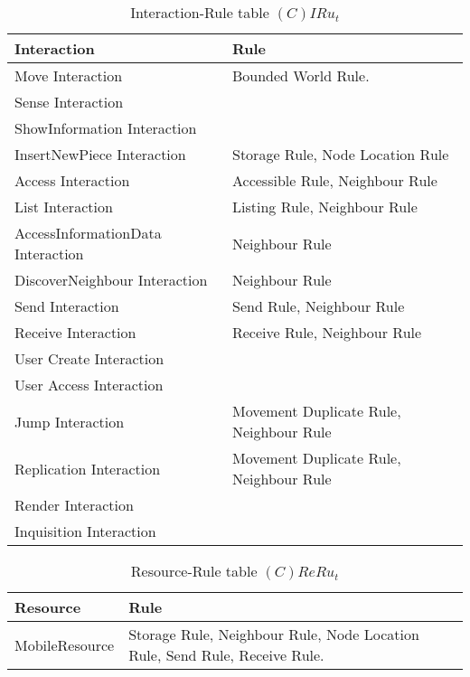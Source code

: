 \begin{table}[H]
	\centering
	\begin{tabular}{|p{4cm}|p{8cm}|}
			\hline
			\textbf{Interaction} & \textbf{Rule} \\
			\hline
			Move Interaction & Bounded World Rule. \\
			\hline
			Sense Interaction & \\
			\hline
			ShowInformation Interaction & \\
			\hline
			InsertNewPiece Interaction & Storage Rule, Node Location Rule \\
			\hline
			Access Interaction & Accessible Rule, Neighbour Rule \\
			\hline
			List Interaction & Listing Rule, Neighbour Rule \\
			\hline
			AccessInformationData Interaction & Neighbour Rule\\
			\hline
			DiscoverNeighbour Interaction & Neighbour Rule\\
			\hline
			Send Interaction & Send Rule, Neighbour Rule\\
			\hline
			Receive Interaction & Receive Rule, Neighbour Rule\\
			\hline
			User Create Interaction & \\
			\hline
			User Access Interaction & \\
			\hline
			Jump Interaction & Movement Duplicate Rule, Neighbour Rule \\
			\hline
			Replication Interaction & Movement Duplicate Rule, Neighbour Rule \\
			\hline
			Render Interaction & \\
			\hline
			Inquisition Interaction & \\
			\hline
		\end{tabular}
	\caption{Interaction-Rule table $(C)IRu_t$}
	\label{tab:cirut}
\end{table}

\begin{table}[H]
	\centering
	\begin{tabular}{|p{4cm}|p{8cm}|}
			\hline
			\textbf{Resource} & \textbf{Rule} \\
			\hline
      MobileResource & Storage Rule, Neighbour Rule, Node Location Rule, Send
      Rule, Receive Rule. \\
			\hline
		\end{tabular}
	\caption{Resource-Rule table $(C)ReRu_t$}
	\label{tab:crerut}
\end{table}

